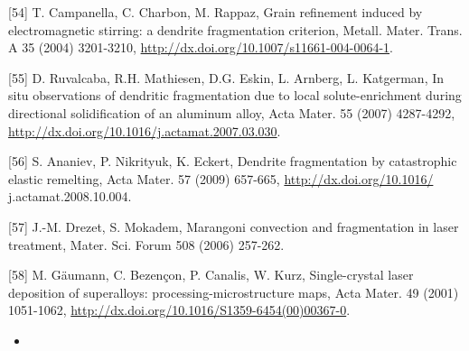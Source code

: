 \documentclass[10pt]{article}
\begin{document}
[54] T. Campanella, C. Charbon, M. Rappaz, Grain refinement induced by electromagnetic stirring: a dendrite fragmentation criterion, Metall. Mater. Trans. A 35 (2004) 3201-3210, \href{http://dx.doi.org/10.1007/s11661-004-0064-1}{http://dx.doi.org/10.1007/s11661-004-0064-1}.

[55] D. Ruvalcaba, R.H. Mathiesen, D.G. Eskin, L. Arnberg, L. Katgerman, In situ observations of dendritic fragmentation due to local solute-enrichment during directional solidification of an aluminum alloy, Acta Mater. 55 (2007) 4287-4292, \href{http://dx.doi.org/10.1016/j.actamat.2007.03.030}{http://dx.doi.org/10.1016/j.actamat.2007.03.030}.

[56] S. Ananiev, P. Nikrityuk, K. Eckert, Dendrite fragmentation by catastrophic elastic remelting, Acta Mater. 57 (2009) 657-665, \href{http://dx.doi.org/10.1016/}{http://dx.doi.org/10.1016/} j.actamat.2008.10.004.

[57] J.-M. Drezet, S. Mokadem, Marangoni convection and fragmentation in laser treatment, Mater. Sci. Forum 508 (2006) 257-262.

[58] M. Gäumann, C. Bezençon, P. Canalis, W. Kurz, Single-crystal laser deposition of superalloys: processing-microstructure maps, Acta Mater. 49 (2001) 1051-1062, \href{http://dx.doi.org/10.1016/S1359-6454(00)00367-0}{http://dx.doi.org/10.1016/S1359-6454(00)00367-0}.

\begin{itemize}
  \item 
\end{itemize}
\end{document}
